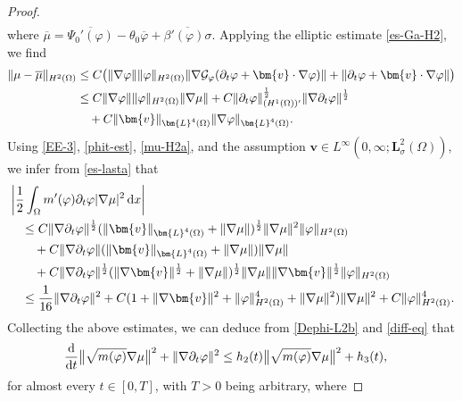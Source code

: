 \documentclass[11pt,reqno]{amsart}
\def\d{{\rm d}}
\def\L{\bm{L}}
\def\ddt{\frac{\d}{\d t}}
\def\vv{\bm{v}}
\begin{document}
\begin{proof}
\begin{align}
\label{CH-b}
\end{align}
%
where $\overline{\mu}= \overline{\Psi_0'(\varphi)}- \theta_0 \overline{\varphi}+  \overline{\beta'(\varphi)\sigma}$. Applying the elliptic estimate \eqref{es-Ga-H2}, we find
%
\begin{align}
\|\mu-\overline{\mu}\|_{H^2(\Omega)}
&
\leq C\big(\|\nabla \varphi\|\|\varphi\|_{H^2(\Omega)}\|\nabla \mathcal{G}_\varphi (\partial_t\varphi+\bm{v}\cdot\nabla \varphi)\|+ \| \partial_t\varphi+\bm{v}\cdot\nabla \varphi\|\big)
\notag\\
&\leq C\|\nabla \varphi\| \|\varphi\|_{H^2(\Omega)}\|\nabla\mu\|
+ C\|\partial_t\varphi\|_{(H^1(\Omega))'}^\frac12\|\nabla \partial_t\varphi\|^\frac12 \notag\\
&\quad +C\|\bm{v}\|_{\bm{L}^4(\Omega)}\|\nabla \varphi\|_{\bm{L}^4(\Omega)}.
\label{mu-H2a}
\end{align}
%
Using \eqref{EE-3}, \eqref{phit-est}, \eqref{mu-H2a}, and the assumption $\vv \in L^\infty(0, \infty;\L^2_\sigma(\Omega))$,
we infer from \eqref{es-lasta} that
%
\begin{align}
& \left| \frac12\int_\Omega m'(\varphi)\partial_t\varphi|\nabla \mu|^2\,\mathrm{d}x\right|
\notag \\
& \quad \leq C\|\nabla \partial_t\varphi\|^\frac12 (\|\bm{v}\|_{\bm{L}^4(\Omega)}+\|\nabla \mu\|)^\frac12 \|\nabla \mu\|^2 \|\varphi\|_{H^2(\Omega)}  \notag\\
&\qquad +C \|\nabla \partial_t\varphi\|  (\|\bm{v}\|_{\bm{L}^4(\Omega)}+\|\nabla \mu\|)  \|\nabla \mu\| \notag \\
&\qquad +C \|\nabla \partial_t\varphi\|^\frac12 (\|\nabla \bm{v}\|^\frac12 +\|\nabla \mu\|)^\frac12 \|\nabla \mu\| \|\nabla \bm{v}\|^\frac12 \|\varphi\|_{H^2(\Omega)}
\notag\\
&\quad \leq \frac{1}{16} \|\nabla \partial_t\varphi\|^2 + C(1+\|\nabla \bm{v}\|^2+ \|\varphi\|_{H^2(\Omega)}^4+\|\nabla \mu\|^2)\|\nabla \mu\|^2 + C\|\varphi\|_{H^2(\Omega)}^4.
\end{align}
%
Collecting the above estimates, we can deduce from \eqref{Dephi-L2b} and \eqref{diff-eq} that
%
\begin{equation}
 \label{DI-alpha}
\begin{split}
 &  \ddt \big\|\sqrt{m(\varphi)}\nabla \mu\big\|^2
 +  \|\nabla \partial_t \varphi\|^2
   \leq  h_2(t)  \big\|\sqrt{m(\varphi)}\nabla \mu\big\|^2 + h_3(t),
\end{split}
\end{equation}
%
for almost every $t \in [0,T]$, with $T>0$ being arbitrary, where

\end{proof}
\end{document}
